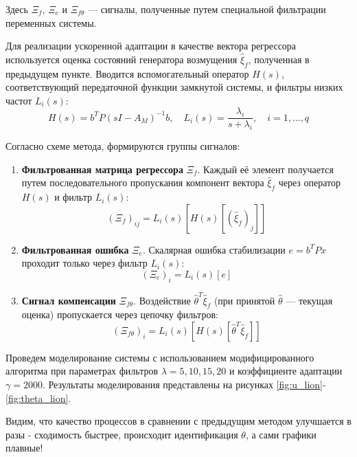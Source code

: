 \documentclass[a4paper,hidelinks,14pt]{extarticle}
\begin{document}
	Здесь $\Xi_f$, $\Xi_e$ и $\Xi_{f\theta}$ — сигналы, полученные путем специальной фильтрации переменных системы. 
	
	Для реализации ускоренной адаптации в качестве вектора регрессора используется оценка состояний генератора возмущения $\hat{\xi}_f$, полученная в предыдущем пункте. Вводится вспомогательный оператор $H(s)$, соответствующий передаточной функции замкнутой системы, и фильтры низких частот $L_i(s)$:
	\begin{equation}
		H(s) = b^T P (sI - A_M)^{-1} b, \quad L_i(s) = \frac{\lambda_i}{s + \lambda_i}, \quad i=1,\dots,q
	\end{equation}
	
	Согласно схеме метода, формируются группы сигналов:
	\begin{enumerate}
		\item \textbf{Фильтрованная матрица регрессора} $\Xi_f$. Каждый её элемент получается путем последовательного пропускания компонент вектора $\hat{\xi}_f$ через оператор $H(s)$ и фильтр $L_i(s)$:
		\begin{equation}
			(\Xi_f)_{ij} = L_i(s) \left[ H(s) [(\hat{\xi}_f)_j] \right]
		\end{equation}
		
		\item \textbf{Фильтрованная ошибка} $\Xi_e$. Скалярная ошибка стабилизации $e = b^T P x$ проходит только через фильтр $L_i(s)$:
		\begin{equation}
			(\Xi_e)_i = L_i(s) [e]
		\end{equation}
		
		\item \textbf{Сигнал компенсации} $\Xi_{f\theta}$. Воздействие $\hat{\theta}^T \hat{\xi}_f$ (при принятой $\hat{\theta}$ — текущая оценка) пропускается через цепочку фильтров:
		\begin{equation}
			(\Xi_{f\theta})_i = L_i(s) \left[ H(s) [\hat{\theta}^T \hat{\xi}_f] \right]
		\end{equation}
	\end{enumerate}

	Проведем моделирование системы с использованием модифицированного алгоритма при параметрах фильтров $\lambda = {5, 10, 15, 20}$ и коэффициенте адаптации $\gamma = 2000$. Результаты моделирования представлены на рисунках \ref{fig:u_lion}-\ref{fig:theta_lion}. 
	
	Видим, что качество процессов в сравнении с предыдущим методом улучшается в разы - сходимость быстрее, происходит идентификация $\theta$, а сами графики плавные!
\end{document}
